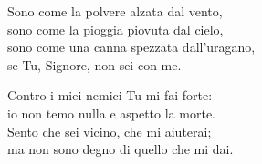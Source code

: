 

\spazio

\strofa Sono come la polvere alzata dal vento,\\
sono come la pioggia piovuta dal cielo,\\
sono come una canna spezzata dall'uragano,\\
se Tu, Signore, non sei con me.

\spazio


\spazio

\strofa Contro i miei nemici Tu mi fai forte:\\
io non temo nulla e aspetto la morte.\\
Sento che sei vicino, che mi aiuterai;\\
ma non sono degno di quello che mi dai.

\spazio

